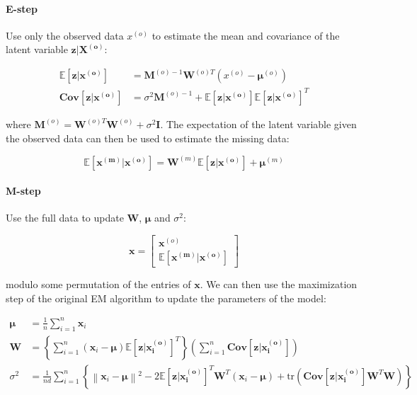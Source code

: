 \documentclass{article}
\newcommand{\E}{\mathbb{E}}
\begin{document}
\paragraph{E-step} Use only the observed data $x^{(o)}$ to estimate the mean and covariance of the latent variable $\mathbf{z|X^{(o)}}$:

\begin{align}
    \label{eq:ppca_e_step_E}
    \E[\mathbf{z|x^{(o)}}] &= \mathbf{M}^{(o)-1}\mathbf{W}^{(o)T}\left(x^{(o)} - \boldsymbol{\mu}^{(o)}\right) \\
    \label{eq:ppca_e_step_Cov}
    \mathbf{Cov}[\mathbf{z|x^{(o)}}] &= \sigma^2\mathbf{M}^{(o)-1} + \E[\mathbf{z|x^{(o)}}]\E[\mathbf{z|x^{(o)}}]^T
\end{align}
    
    where $\mathbf{M}^{(o)} = \mathbf{W}^{(o)T}\mathbf{W}^{(o)} + \sigma^2\mathbf{I}$. The expectation of the latent variable given the observed data can then be used to estimate the missing data:

\begin{equation}
    \label{eq:ppca_e_step_completion}
    \E[\mathbf{x^{(m)}|x^{(o)}}] = \mathbf{W}^{(m)}\E[\mathbf{z|x^{(o)}}] + \boldsymbol{\mu}^{(m)}
\end{equation}

\paragraph{M-step} Use the full data to update $\mathbf{W}$, $\boldsymbol{\mu}$ and $\sigma^2$:

\begin{equation}
    \label{eq:ppca_m_step}
    \mathbf{x} = \left[
        \begin{array}{c}
            \mathbf{x}^{(o)} \\
            \E[\mathbf{x^{(m)}|x^{(o)}}]
        \end{array}       
    \right]
\end{equation}

modulo some permutation of the entries of $\mathbf{x}$. We can then use the maximization step of the original EM algorithm to update the parameters of the model:

\begin{align}
    \label{eq:ppca_mu}
    \boldsymbol{\mu} &= \frac{1}{n}\sum_{i=1}^n \mathbf{x}_i \\
    \label{eq:ppca_W}
    \mathbf{W} &= \left\{
        \sum_{i=1}^n \left(\mathbf{x}_i - \boldsymbol{\mu}\right) \E[\mathbf{z|x_i^{(o)}}]^T
    \right\} \left(
        \sum_{i=1}^n \mathbf{Cov}[\mathbf{z|x_i^{(o)}}]
    \right) \\
    \label{eq:ppca_sigma}
    \sigma^2 &= \frac{1}{nd}\sum_{i=1}^n \left\{
        \left\| \mathbf{x}_i - \boldsymbol{\mu}\right\|^2 - 2\E[\mathbf{z|x_i^{(o)}}]^T\mathbf{W}^T\left(\mathbf{x}_i - \boldsymbol{\mu}\right) + \text{tr}\left(\mathbf{Cov}[\mathbf{z|x_i^{(o)}}]\mathbf{W}^T\mathbf{W}\right)
    \right\}
\end{align}
\end{document}

